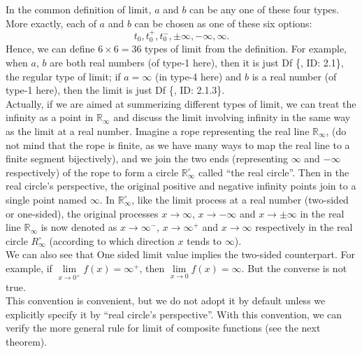 \documentclass{article}
\begin{document}
\begin{Rmk}{}
    In the common definition of limit, $a$ and $b$ can be any one of these four types. More exactly, each of $a$ and $b$ can be chosen as one of these six options:
    $$ t_0, t_0^+, t_0^-, \pm\infty, -\infty, \infty. $$
    Hence, we can define $6\times 6 = 36$ types of limit from the definition. For example, when $a$, $b$ are both real numbers (of type-1 here), then it is just Df \{, ID: 2.1\}, the regular type of limit; if $a = \infty$ (in type-4 here) and $b$ is a real number (of type-1 here), then the limit is just Df \{, ID: 2.1.3\}.\\
    Actually, if we are aimed at summerizing different types of limit, we can treat the infinity as a point in $\mathbb{R}_\infty$ and discuss the limit involving infinity in the same way as the limit at a real number. \textcolor{Df}{Imagine a rope representing the real line $\mathbb{R}_\infty$, (do not mind that the rope is finite, as we have many ways to map the real line to a finite segment bijectively), and we join the two ends (representing $\infty$ and $-\infty$ respectively) of the rope to form a circle $\mathbb{R}_\infty^\circ$ called ``the real circle''. Then in the real circle's perspective, the original positive and negative infinity points join to a single point named $\infty$. In $\mathbb{R}_\infty^\circ$, like the limit process at a real number (two-sided or one-sided), the original processes $x\rightarrow\infty$, $x\rightarrow -\infty$ and $x\rightarrow\pm\infty$ in the real line $\mathbb{R}_\infty$ is now denoted as $x\rightarrow \infty^-$, $x\rightarrow \infty^+$ and $x\rightarrow \infty$ respectively in the real circle $R_\infty^\circ$ (according to which direction $x$ tends to $\infty$).}\\
    We can also see that \textcolor{Th}{One sided limit value implies the two-sided counterpart. For example, if $\lim\limits_{x\to 0^+} f(x) = \infty^+$, then $\lim\limits_{x\to 0} f(x) = \infty$. But the converse is not true.}\\
    This convention is convenient, but we do not adopt it by default unless we explicitly specify it by ``real circle's perspective''. With this convention, we can verify the more general rule for limit of composite functions (see the next theorem).
\end{Rmk}
\end{document}
